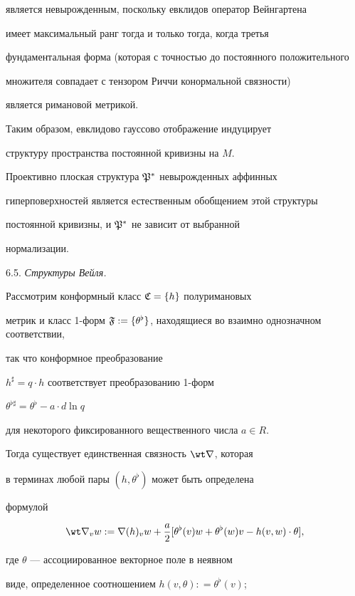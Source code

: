 является невырожденным, поскольку евклидов оператор Вейнгартена

имеет максимальный ранг тогда и только тогда, когда третья

фундаментальная форма (которая с точностью до постоянного положительного

множителя совпадает с тензором Риччи конормальной связности)

является римановой метрикой.

Таким образом, евклидово гауссово отображение индуцирует

структуру пространства постоянной кривизны на $M$.

Проективно плоская структура $\frak P^*$ невырожденных аффинных

гиперповерхностей является естественным обобщением этой структуры

постоянной кривизны, и $\frak P^*$ не зависит от выбранной

нормализации.

\medskip



6.5. {\it Структуры Вейля.}

Рассмотрим конформный класс $\frak C = \{ h \}$ полуримановых

метрик и класс 1-форм $\frak F := \{

\theta^{\flat} \}$, находящиеся во взаимно однозначном соответствии,

так что конформное преобразование

$h^\sharp = q \cdot h$ соответствует преобразованию 1-форм

$\theta^{\flat \sharp} = \theta^{\flat} - a \cdot d\ln q$

для некоторого фиксированного вещественного числа $a \in R$.

Тогда существует единственная связность $\wt \nabla$, которая

в терминах любой пары $(h, \theta^{\flat} )$ может быть определена

формулой

$$

\wt \nabla _v w := \nabla(h) _v w + \frac{a}{2}[\theta^{\flat}(v)w +

\theta^{\flat}(w)v - h(v,w) \cdot \theta],

$$

где $\theta$ --- ассоциированное векторное поле в неявном

виде, определенное соотношением $h(v, \theta): = \theta^{\flat}(v)$;

